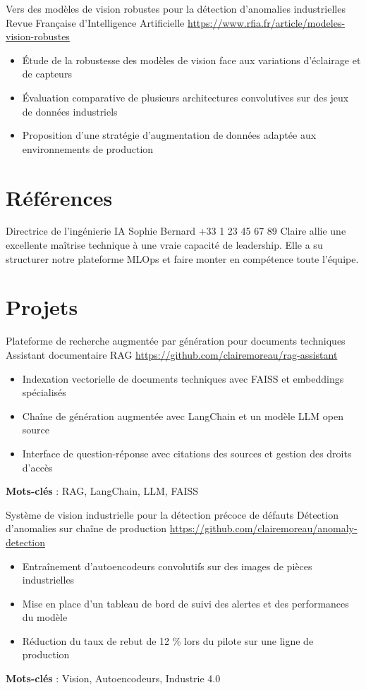 \documentclass[a4paper, serif, 10pt]{moderncv}
\begin{document}
        {Vers des modèles de vision robustes pour la détection d'anomalies industrielles}
        {Revue Française d'Intelligence Artificielle}
        {\url{https://www.rfia.fr/article/modeles-vision-robustes}}
        {}
        {\begin{itemize}
\item Étude de la robustesse des modèles de vision face aux variations d'éclairage et de capteurs
\item Évaluation comparative de plusieurs architectures convolutives sur des jeux de données industriels
\item Proposition d'une stratégie d'augmentation de données adaptée aux environnements de production
\end{itemize}}
\section{Références}

        {Directrice de l'ingénierie IA}
        {Sophie Bernard}
        {+33 1 23 45 67 89}
        {}
        {Claire allie une excellente maîtrise technique à une vraie capacité de leadership. Elle a su structurer notre plateforme MLOps et faire monter en compétence toute l'équipe.}
\section{Projets}

        {Plateforme de recherche augmentée par génération pour documents techniques}
        {Assistant documentaire RAG}
        {\url{https://github.com/clairemoreau/rag-assistant}}
        {}
        {\begin{itemize}
\item Indexation vectorielle de documents techniques avec FAISS et embeddings spécialisés
\item Chaîne de génération augmentée avec LangChain et un modèle LLM open source
\item Interface de question-réponse avec citations des sources et gestion des droits d'accès
\end{itemize}
\textbf{Mots-clés} : RAG, LangChain, LLM, FAISS}

        {Système de vision industrielle pour la détection précoce de défauts}
        {Détection d'anomalies sur chaîne de production}
        {\url{https://github.com/clairemoreau/anomaly-detection}}
        {}
        {\begin{itemize}
\item Entraînement d'autoencodeurs convolutifs sur des images de pièces industrielles
\item Mise en place d'un tableau de bord de suivi des alertes et des performances du modèle
\item Réduction du taux de rebut de 12 \% lors du pilote sur une ligne de production
\end{itemize}
\textbf{Mots-clés} : Vision, Autoencodeurs, Industrie 4.0}
\end{document}
